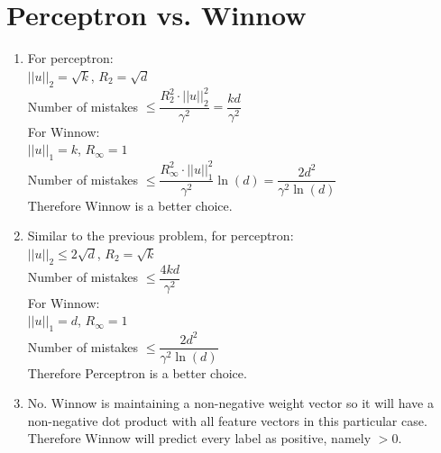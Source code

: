 \documentclass[english]{article}
\begin{document}
\section{Perceptron vs. Winnow}
\begin{enumerate}
    \item For perceptron:\\
    $||u||_2 = \sqrt{k}$, $R_2 = \sqrt{d}$\\
    Number of mistakes $\leq \dfrac{R_2^2 \cdot ||u||_2^2}{\gamma^2} = \dfrac{kd}{\gamma^2}$\\
    For Winnow:\\
    $||u||_1 = k$, $R_\infty = 1$\\
    Number of mistakes $\leq \dfrac{R_\infty^2 \cdot ||u||_1^2}{\gamma^2} \ln{(d)}= \dfrac{2d^2}{\gamma^2\ln{(d)}}$\\
    Therefore Winnow is a better choice.
    \clearpage
    \item Similar to the previous problem, for perceptron:\\
    $||u||_2 \leq 2\sqrt{d}$, $R_2 = \sqrt{k}$\\
    Number of mistakes $\leq \dfrac{4kd}{\gamma^2}$\\
    For Winnow:\\
    $||u||_1 = d$, $R_\infty = 1$\\
    Number of mistakes $\leq \dfrac{2d^2}{\gamma^2\ln{(d)}}$\\
    Therefore Perceptron is a better choice.
    \clearpage
    \item No. Winnow is maintaining a non-negative weight vector so it will have a non-negative dot product with all feature vectors in this particular case. Therefore Winnow will predict every label as positive, namely $>0$.
\end{enumerate}
\clearpage
\end{document}
